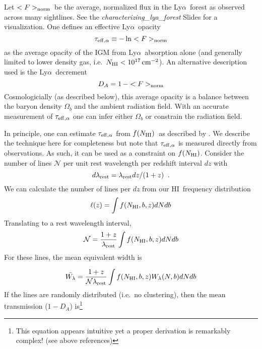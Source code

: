 \documentclass[graybox]{svmult}
\newcommand{\HI}{H{\sc I}}
\def\lya{Ly$\alpha$}
\newcommand{\mnhi}{N_{\rm HI}}
\def\cm#1{\, {\rm cm^{#1}}}
\def\mfnhi{f(\mnhi)}
\def\fnhi{$\mfnhi$}
\def\mfnorm{<F>_{\rm norm}}
\def\fnorm{$\mfnorm$}
\begin{document}
Let \fnorm\ be the average, normalized flux in
the \lya\ forest as observed across many sightlines. 
See the {\it characterizing\_lya\_forest} Slides for 
a visualization.
One defines an effective \lya\ opacity
\begin{equation}
\tau_{\rm eff, \alpha} \equiv - \ln \mfnorm
\end{equation}
as the average opacity of the IGM from \lya\ absorption alone
(and generally limited to lower density gas, i.e.\ $\mnhi < 10^{17} \cm{-2}$).
An alternative description used is
the \lya\ decrement
\begin{equation}
D_A = 1 \, - \mfnorm
\end{equation}
Cosmologicially (as described below), this
average opacity is a balance between the baryon density 
$\Omega_b$ and the ambient radiation field.
With an accurate measurement of $\tau_{\rm eff,\alpha}$
one can infer either $\Omega_b$ or constrain the radiation
field. 

In principle, one can estimate $\tau_{\rm eff,\alpha}$
from \fnhi\ as described by
\cite{mj90,press93}. %
We describe the technique here for completeness but note
that $\tau_{\rm eff,\alpha}$ is measured directly from observations.
As such, it can be used as a constraint on \fnhi.
Consider the number of lines $\mathcal{N}$ per unit rest wavelength 
per redshift interval $dz$
with
\begin{equation}
d\lambda_{\rm rest} = \lambda_{\rm rest} dz / (1+z) \;\; .
\end{equation}
We can calculate the number of lines per $dz$
from  our \HI\ frequency distribution
\begin{equation}
\ell(z) = \int f(\mnhi,b,z) dN db
\end{equation}
Translating to a rest wavelength interval,
\begin{equation}
\mathcal{N} = \frac{1+z}{\lambda_{\rm rest}} \int f(\mnhi,b,z) dN db
\end{equation}
For these lines, the
mean equivalent width is

\begin{equation}
\bar{W_\lambda} = \frac{1+z}{\mathcal{N} \lambda_{\rm rest}} 
\int f(\mnhi,b,z) W_\lambda(N,b) dN db 
\end{equation}
If the lines are randomly distributed (i.e.\ no clustering),
then the mean transmission ($1-D_A$) is\footnote{
This equation appears intuitive yet a proper derivation 
is remarkably complex! (see above references)}
\end{document}
